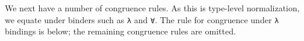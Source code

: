 \documentclass[authoryear, acmsmall, screen, review, nonacm]{acmart}
\begin{document}
\Ni We next have a number of congruence rules. As this is type-level normalization, we equate under binders such as \verb!λ! and \verb!∀!. The rule for congruence under \verb!λ! bindings is below; the remaining congruence rules are omitted.
\begin{code}%
%
\>[4]\AgdaSpace{}%
\AgdaSymbol{:}\AgdaSpace{}%
\AgdaSpace{}%
\AgdaSymbol{\{}\AgdaSpace{}%
\AgdaSpace{}%
\AgdaSymbol{:}\AgdaSpace{}%
\AgdaSpace{}%
\AgdaSymbol{(}\AgdaSpace{}%
\AgdaOperator{\AgdaInductiveConstructor{,,}}\AgdaSpace{}%
\AgdaSymbol{)}\AgdaSpace{}%
\AgdaSymbol{\}}\AgdaSpace{}%
\AgdaSpace{}%
\AgdaSpace{}%
\AgdaSpace{}%
\AgdaSpace{}%
\AgdaSpace{}%
\AgdaSpace{}%
\AgdaSpace{}%
\AgdaSpace{}%
\AgdaSpace{}%
\<%
\end{code}
\end{document}
